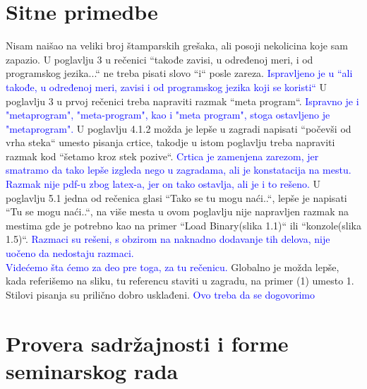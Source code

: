 \documentclass[a4paper]{report}
\newcommand{\odgovor}[1]{\textcolor{blue}{#1}}
\begin{document}
\section{Sitne primedbe}
Nisam naišao na veliki broj štamparskih grešaka, ali posoji nekolicina koje sam zapazio. U poglavlju 3 u rečenici ``takođe zavisi, u određenoj meri, i od programskog jezika...`` ne treba pisati slovo ``i`` posle zareza. 
\odgovor{Ispravljeno je u ``ali takođe, u određenoj meri, zavisi i od programskog jezika koji se koristi``}
U poglavlju 3 u prvoj rečenici treba napraviti razmak ``meta program``.
\odgovor{Ispravno je i "metaprogram", "meta-program", kao i "meta program", stoga ostavljeno je "metaprogram".} 
U poglavlju 4.1.2 možda je lepše u zagradi napisati ``počevši od vrha steka`` umesto pisanja crtice, takodje u istom poglavlju treba napraviti razmak kod ``šetamo kroz stek pozive``.  
\odgovor{Crtica je zamenjena zarezom, jer smatramo da tako lepše izgleda nego u zagradama, ali je konstatacija na mestu. Razmak nije pdf-u zbog latex-a, jer on tako ostavlja, ali je i to rešeno.}
U poglavlju 5.1 jedna od rečenica glasi ``Tako se tu mogu naći..``, lepše je napisati ``Tu se mogu naći..``, na više mesta u ovom poglavlju nije napravljen razmak 
na mestima gde je potrebno kao na primer ``Load Binary(slika 1.1)`` ili ``konzole(slika 1.5)``.
\odgovor{Razmaci su rešeni, s obzirom na naknadno dodavanje tih delova, nije uočeno da nedostaju razmaci. \\Videćemo šta ćemo za deo pre toga, za tu rečenicu.}
Globalno je možda lepše, kada referišemo na sliku, tu referencu staviti u zagradu, na primer (1) umesto 1. Stilovi pisanja su prilično dobro usklađeni.
\odgovor{Ovo treba da se dogovorimo}

\section{Provera sadržajnosti i forme seminarskog rada}
\end{document}
